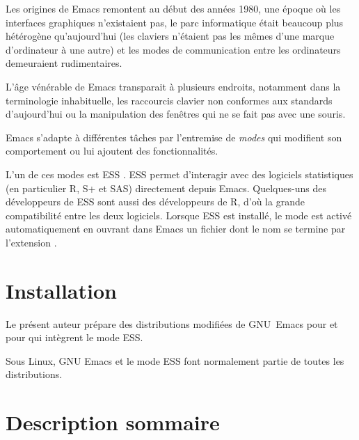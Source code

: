 Les origines de Emacs remontent au début des années 1980, une époque
où les interfaces graphiques n'existaient pas, le parc informatique
était beaucoup plus hétérogène qu'aujourd'hui (les claviers n'étaient
pas les mêmes d'une marque d'ordinateur à une autre) et les modes de
communication entre les ordinateurs demeuraient rudimentaires.

L'âge vénérable de Emacs transparait à plusieurs endroits, notamment
dans la terminologie inhabituelle, les raccourcis clavier non
conformes aux standards d'aujourd'hui ou la manipulation des fenêtres
qui ne se fait pas avec une souris.

Emacs s'adapte à différentes tâches par l'entremise de \emph{modes}
qui modifient son comportement ou lui ajoutent des fonctionnalités.

L'un de ces modes est ESS \citep[\emph{Emacs Speaks
  Statistics},][]{ESS}. ESS permet d'interagir avec des logiciels
statistiques (en particulier R, S+ et SAS) directement depuis Emacs.
Quelques-uns des développeurs de ESS sont aussi des développeurs de R,
d'où la grande compatibilité entre les deux logiciels. Lorsque ESS est
installé, le mode est activé automatiquement en ouvrant dans Emacs un
fichier dont le nom se termine par l'extension .


\section{Installation}
\label{sec:emacs+ess:installation}

Le présent auteur prépare des distributions modifiées de GNU~Emacs
pour 
et pour 
qui intègrent le mode ESS.

Sous Linux, GNU Emacs et le mode ESS font normalement partie de toutes
les distributions.

\section{Description sommaire}
\label{sec:emacs+ess:description}

